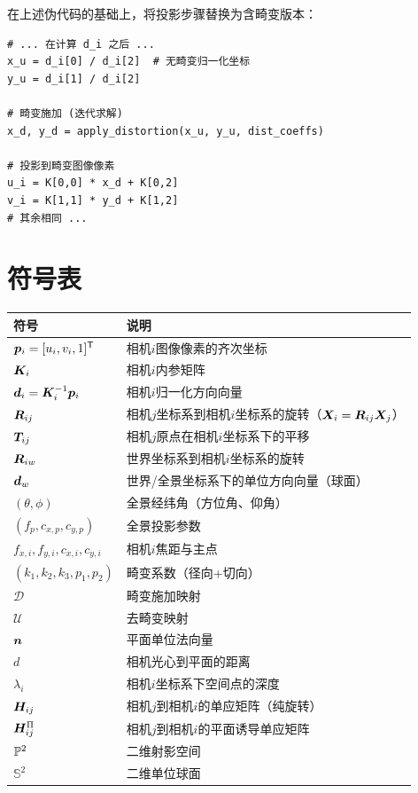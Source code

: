 在上述伪代码的基础上，将投影步骤替换为含畸变版本：

\begin{verbatim}
# ... 在计算 d_i 之后 ...
x_u = d_i[0] / d_i[2]  # 无畸变归一化坐标
y_u = d_i[1] / d_i[2]

# 畸变施加 (迭代求解)
x_d, y_d = apply_distortion(x_u, y_u, dist_coeffs)

# 投影到畸变图像像素
u_i = K[0,0] * x_d + K[0,2]
v_i = K[1,1] * y_d + K[1,2]
# 其余相同 ...
\end{verbatim}

\section*{符号表}
\label{apx:symbols}

\renewcommand{\arraystretch}{1.4}
\begin{tabularx}{\textwidth}{lX}
\toprule
\textbf{符号} & \textbf{说明} \\
\midrule
$\bm{p}_i = [u_i, v_i, 1]^{\mathsf{T}}$ & 相机$i$图像像素的齐次坐标 \\
$\bm{K}_i$ & 相机$i$内参矩阵 \\
$\bm{d}_i = \bm{K}_i^{-1}\bm{p}_i$ & 相机$i$归一化方向向量 \\
$\bm{R}_{ij}$ & 相机$j$坐标系到相机$i$坐标系的旋转（$\bm{X}_i = \bm{R}_{ij}\bm{X}_j$） \\
$\bm{T}_{ij}$ & 相机$j$原点在相机$i$坐标系下的平移 \\
$\bm{R}_{iw}$ & 世界坐标系到相机$i$坐标系的旋转 \\
$\bm{d}_w$ & 世界/全景坐标系下的单位方向向量（球面） \\
$(\theta, \phi)$ & 全景经纬角（方位角、仰角） \\
$(f_p, c_{x,p}, c_{y,p})$ & 全景投影参数 \\
$f_{x,i}, f_{y,i}, c_{x,i}, c_{y,i}$ & 相机$i$焦距与主点 \\
$(k_1, k_2, k_3, p_1, p_2)$ & 畸变系数（径向+切向） \\
$\mathcal{D}$ & 畸变施加映射 \\
$\mathcal{U}$ & 去畸变映射 \\
$\bm{n}$ & 平面单位法向量 \\
$d$ & 相机光心到平面的距离 \\
$\lambda_i$ & 相机$i$坐标系下空间点的深度 \\
$\bm{H}_{ij}$ & 相机$j$到相机$i$的单应矩阵（纯旋转） \\
$\bm{H}_{ij}^{\Pi}$ & 相机$j$到相机$i$的平面诱导单应矩阵 \\
$\mathbb{P}^2$ & 二维射影空间 \\
$\mathbb{S}^2$ & 二维单位球面 \\
\bottomrule
\end{tabularx}
